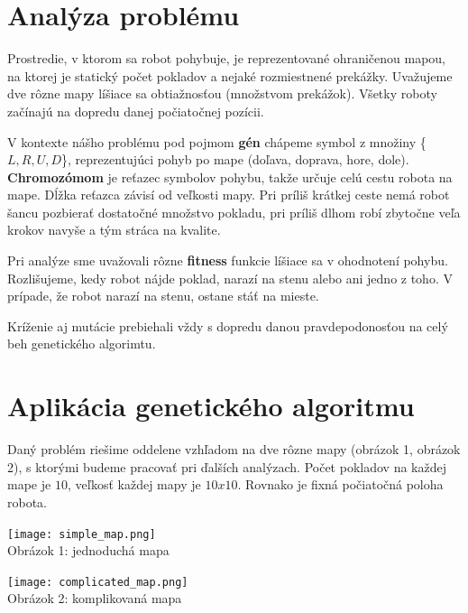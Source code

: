 \documentclass[10pt]{paper}
\begin{document}
\newpage

\section{Analýza problému}

Prostredie, v ktorom sa robot pohybuje, je reprezentované ohraničenou mapou, na ktorej je statický počet pokladov a nejaké rozmiestnené prekážky. Uvažujeme dve rôzne mapy líšiace sa obtiažnosťou (množstvom prekážok). Všetky roboty začínajú na dopredu danej počiatočnej pozícii.

V kontexte nášho problému pod pojmom \textbf{gén} chápeme symbol z množiny \{$L, R, U, D$\}, reprezentujúci pohyb po mape (doľava, doprava, hore, dole). \textbf{Chromozómom} je reťazec symbolov pohybu, takže určuje celú cestu robota na mape. Dĺžka reťazca závisí od veľkosti mapy. Pri príliš krátkej ceste nemá robot šancu pozbierať dostatočné množstvo pokladu, pri príliš dlhom robí zbytočne veľa krokov navyše a tým stráca na kvalite. 

Pri analýze sme uvažovali rôzne \textbf{fitness} funkcie líšiace sa v ohodnotení pohybu. Rozlišujeme, kedy robot nájde poklad, narazí na stenu alebo ani jedno z toho. V prípade, že robot narazí na stenu, ostane stáť na mieste.

Kríženie aj mutácie prebiehali vždy s dopredu danou pravdepodonosťou na celý beh genetického algorimtu.

\section{Aplikácia genetického algoritmu}
Daný problém riešime oddelene vzhľadom na dve rôzne mapy (obrázok 1, obrázok 2), s ktorými budeme pracovať pri ďalších analýzach. Počet pokladov na každej mape je $10$, veľkosť každej mapy je $10x10$. Rovnako je fixná počiatočná poloha robota.

\begin{center}
\begin{paracol}{2}
\setlength{\columnseprule}{0pt}
\setlength{\columnsep}{0em}
\begin{leftcolumn}
	\texttt{[image: simple\_map.png]} \\
	Obrázok 1: jednoduchá mapa
\end{leftcolumn}

\begin{rightcolumn}
	\texttt{[image: complicated\_map.png]} \\
	Obrázok 2: komplikovaná mapa
\end{rightcolumn}
\end{paracol}
\end{center}
\end{document}
